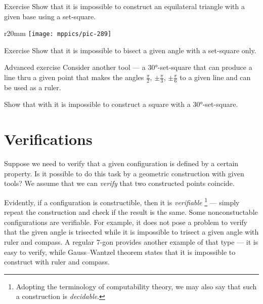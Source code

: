 \begin{thm}{Exercise}\label{ex:equilateral triangle}
Show that it is impossible to construct an equilateral triangle with a given base using
a set-square.
\end{thm}

{

\begin{wrapfigure}{r}{20mm}
\vskip-8mm
\centering
\texttt{[image: mppics/pic-289]}
\end{wrapfigure}


\begin{thm}{Exercise}\label{ex:set-square-bisect}
Show that it is impossible to bisect a given angle with a set-square only.
\end{thm}

\begin{thm}{Advanced exercise}\label{ex:90-60-30}
Consider another tool --- a 30°-set-square that can produce a line thru a given point
that makes the angles
$\tfrac\pi2$, $\pm\tfrac\pi3$, $\pm\tfrac\pi6$
to a given line and can be used as a ruler.

{Show that with it is impossible to construct a square with a 30°-set-square.}
\end{thm}

}

\section{Verifications}
\label{sec:verification}

Suppose we need to verify that a given configuration is defined by a certain property. 
Is it possible to do this task by a geometric construction with given tools?
We assume that we can \emph{verify} that two constructed points coincide.

Evidently, if a configuration is constructible, then it is \emph{verifiable}%
\footnote{Adopting the terminology of computability theory, we may also say that such a construction is \emph{decidable}.} --- simply repeat the construction and check if the result is the same.
Some nonconstuctable configurations are verifiable.
For example, it does not pose a problem to verify that the given angle is trisected while it is impossible to trisect a given angle with ruler and compass.
A regular 7-gon provides another example of that type --- it is easy to verify, while Gauss--Wantzel theorem states that it is impossible to construct with ruler and compass.

